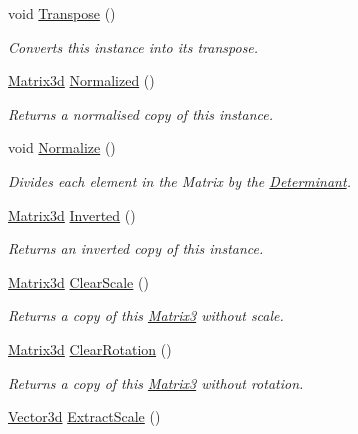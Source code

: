 \begin{DoxyCompactItemize}
void \hyperlink{struct_open_t_k_1_1_matrix3d_a1dde941d3dd28fe4ec4b214b552335ab}{Transpose} ()
\begin{DoxyCompactList}\small\item\em Converts this instance into its transpose. \end{DoxyCompactList}\item 
\hyperlink{struct_open_t_k_1_1_matrix3d}{Matrix3d} \hyperlink{struct_open_t_k_1_1_matrix3d_aa4b4cd48616745d09fe36484dcfdac50}{Normalized} ()
\begin{DoxyCompactList}\small\item\em Returns a normalised copy of this instance. \end{DoxyCompactList}\item 
void \hyperlink{struct_open_t_k_1_1_matrix3d_aeebe0f7dcc96a5abc7d6401f8c59dcda}{Normalize} ()
\begin{DoxyCompactList}\small\item\em Divides each element in the Matrix by the \hyperlink{struct_open_t_k_1_1_matrix3d_af2084cf120a96d19e0c7c11489d05319}{Determinant}. \end{DoxyCompactList}\item 
\hyperlink{struct_open_t_k_1_1_matrix3d}{Matrix3d} \hyperlink{struct_open_t_k_1_1_matrix3d_ae146be58d734ab0576be87d9d064928d}{Inverted} ()
\begin{DoxyCompactList}\small\item\em Returns an inverted copy of this instance. \end{DoxyCompactList}\item 
\hyperlink{struct_open_t_k_1_1_matrix3d}{Matrix3d} \hyperlink{struct_open_t_k_1_1_matrix3d_a08c5338bc12098f4d300f3540bee3cd3}{Clear\-Scale} ()
\begin{DoxyCompactList}\small\item\em Returns a copy of this \hyperlink{struct_open_t_k_1_1_matrix3}{Matrix3} without scale. \end{DoxyCompactList}\item 
\hyperlink{struct_open_t_k_1_1_matrix3d}{Matrix3d} \hyperlink{struct_open_t_k_1_1_matrix3d_a453ed6b837c752eec9522b00731290ad}{Clear\-Rotation} ()
\begin{DoxyCompactList}\small\item\em Returns a copy of this \hyperlink{struct_open_t_k_1_1_matrix3}{Matrix3} without rotation. \end{DoxyCompactList}\item 
\hyperlink{struct_open_t_k_1_1_vector3d}{Vector3d} \hyperlink{struct_open_t_k_1_1_matrix3d_a0dd3806e557dd6955cdca0e1cd92e2b0}{Extract\-Scale} ()

\end{DoxyCompactItemize}
